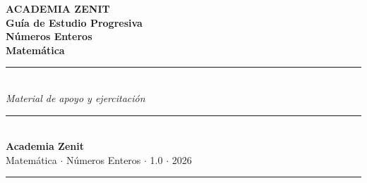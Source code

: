 \documentclass[11pt, letterpaper]{article}
\begin{document}

\thispagestyle{empty}

\vspace*{2.5cm}

\begin{center}
  {\Huge\bfseries\color{zenitnavy} ACADEMIA ZENIT}\\[0.5cm]
  {\LARGE\bfseries\color{zenitblue} Gu\'ia de Estudio Progresiva}\\[0.3cm]
  {\LARGE\bfseries\color{zenitblue} N\'umeros Enteros}\\[1.4cm]
  {\Large\bfseries\color{zenitnavy} Matem\'atica}\\[1.2cm]
  \textcolor{zenitnavy}{\rule{0.72\linewidth}{1.5pt}}\\[1.0cm]
  {\large\itshape\color{zenitnavy} Material de apoyo y ejercitaci\'on}
\end{center}

\vfill

\begin{center}
  \textcolor{zenitnavy}{\rule{0.72\linewidth}{0.6pt}}\\[0.5cm]
  {\large\bfseries\color{zenitnavy} Academia Zenit}\\[3pt]
  {\color{zenitgold} Matem\'atica $\cdot$ N\'umeros Enteros $\cdot$ 1.0 $\cdot$ 2026}\\[0.4cm]
  \textcolor{zenitnavy}{\rule{0.72\linewidth}{0.6pt}}
\end{center}

\clearpage
\thispagestyle{empty}

\vspace*{0.2cm}

\end{document}

